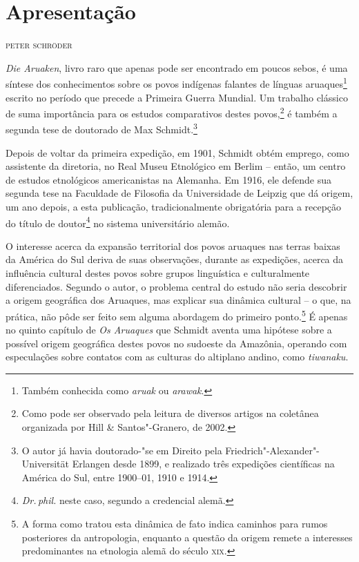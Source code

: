 \newcommand{\subtitulo}[1]{\NoCaseChange{\textnormal{\break\Large\itshape#1}}}
\chapter*{Apresentação\smallskip\subtitulo{Um clássico da etnologia\\ sul-americanista}}


\begin{flushright}
\textsc{peter schröder}\medskip
\end{flushright}

\noindent{}\textit{Die Aruaken}, livro raro que apenas pode ser encontrado em poucos sebos, é uma síntese dos conhecimentos sobre os povos indígenas falantes de línguas aruaques\footnote{Também conhecida como \textit{aruak} ou \textit{arawak}.} escrito no período que precede a Primeira Guerra Mundial. Um trabalho clássico de suma importância para os estudos comparativos destes povos,\footnote{Como pode ser observado pela leitura de diversos artigos na coletânea organizada por Hill \& Santos"-Granero, de 2002.} é também a segunda tese de doutorado de Max Schmidt.\footnote{O autor já havia doutorado-"se em Direito pela Friedrich"-Alexander"-Universität Erlangen desde 1899, e realizado três expedições científicas na América do Sul, entre 1900--01, 1910 e 1914.}

Depois de voltar da primeira expedição, em 1901, Schmidt obtém emprego, como assistente da diretoria, no Real Museu Etnológico em Berlim -- então, um centro de estudos etnológicos americanistas na Alemanha. Em 1916, ele defende sua segunda tese na Faculdade de Filosofia da Universidade de Leipzig que dá origem, um ano depois, a esta publicação, tradicionalmente obrigatória para a recepção do título de doutor\footnote{\textit{Dr.\,phil.} neste caso, segundo a credencial alemã.} no sistema universitário alemão.

O interesse acerca da expansão territorial dos povos aruaques nas terras baixas da América do Sul deriva de suas observações, durante as expedições, acerca da influência cultural destes povos sobre grupos linguística e culturalmente diferenciados. Segundo o autor, o problema central do estudo não seria descobrir a origem geográfica dos Aruaques, mas explicar sua dinâmica cultural -- o que, na prática, não pôde ser feito sem alguma abordagem do primeiro ponto.\footnote{A forma como tratou esta dinâmica de fato indica caminhos para rumos posteriores da antropologia, enquanto a questão da origem remete a interesses predominantes na etnologia alemã do século \textsc{xix}.} É apenas no quinto capítulo de \textit{Os Aruaques} que Schmidt aventa uma hipótese sobre a possível origem geográfica destes povos no sudoeste da Amazônia, operando com especulações sobre contatos com as culturas do altiplano andino, como \textit{tiwanaku}.

